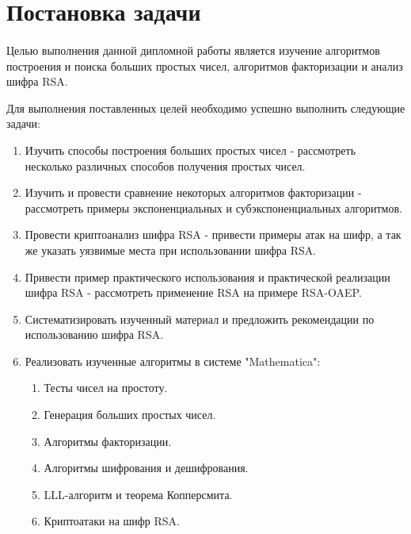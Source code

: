 \section*{Постановка задачи}

  \paragraph{} Целью выполнения данной дипломной работы является изучение алгоритмов построения и поиска больших простых чисел, алгоритмов факторизации и анализ 
  шифра RSA.

    Для выполнения поставленных целей необходимо успешно выполнить следующие задачи:

    \begin{enumerate}
      \item Изучить способы построения больших простых чисел - рассмотреть несколько различных способов получения простых чисел.
      \item Изучить и провести сравнение некоторых алгоритмов факторизации - рассмотреть примеры экспоненциальных и субэкспоненциальных алгоритмов.
      \item Провести криптоанализ шифра RSA - привести примеры атак на шифр, а так же указать уязвимые места при использовании шифра RSA.
      \item Привести пример практического использования и практической реализации шифра RSA - рассмотреть применение RSA на примере RSA-OAEP.
      \item Систематизировать изученный материал и предложить рекомендации по использованию шифра RSA.
      \item Реализовать изученные алгоритмы в системе "Mathematica":
        \begin{enumerate}
          \item Тесты чисел на простоту.
          \item Генерация больших простых чисел.
          \item Алгоритмы факторизации.
          \item Алгоритмы шифрования и дешифрования.
          \item LLL-алгоритм и теорема Копперсмита.
          \item Криптоатаки на шифр RSA.
        \end{enumerate}
    \end{enumerate}